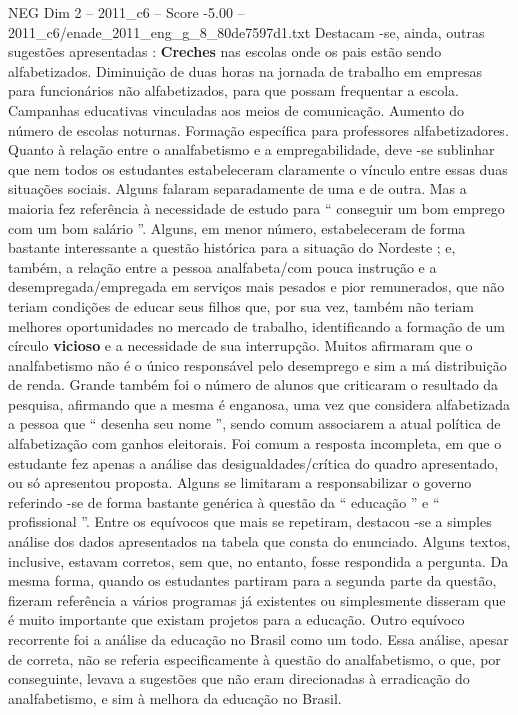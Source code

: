 \begin{textsample}{NEG Dim 2 – 2011\_c6 – Score -5.00 – 2011\_c6/enade\_2011\_eng\_g\_8\_80de7597d1.txt}
Destacam -se, ainda, outras sugestões apresentadas : \textbf{Creches} nas escolas onde os pais estão sendo alfabetizados.
Diminuição de duas horas na jornada de trabalho em empresas para funcionários não alfabetizados, para que possam frequentar a escola.
Campanhas educativas vinculadas aos meios de comunicação.
Aumento do número de escolas noturnas.
Formação específica para professores alfabetizadores.
Quanto à relação entre o analfabetismo e a empregabilidade, deve -se sublinhar que nem todos os estudantes estabeleceram claramente o vínculo entre essas duas situações sociais.
Alguns falaram separadamente de uma e de outra.
Mas a maioria fez referência à necessidade de estudo para “ conseguir um bom emprego com um bom salário ”.
Alguns, em menor número, estabeleceram de forma bastante interessante a questão histórica para a situação do Nordeste ; e, também, a relação entre a pessoa analfabeta/com pouca instrução e a desempregada/empregada em serviços mais pesados e pior remunerados, que não teriam condições de educar seus filhos que, por sua vez, também não teriam melhores oportunidades no mercado de trabalho, identificando a formação de um círculo \textbf{vicioso} e a necessidade de sua interrupção.
Muitos afirmaram que o analfabetismo não é o único responsável pelo desemprego e sim a má distribuição de renda.
Grande também foi o número de alunos que criticaram o resultado da pesquisa, afirmando que a mesma é enganosa, uma vez que considera alfabetizada a pessoa que “ desenha seu nome ”, sendo comum associarem a atual política de alfabetização com ganhos eleitorais.
Foi comum a resposta incompleta, em que o estudante fez apenas a análise das desigualdades/crítica do quadro apresentado, ou só apresentou proposta.
Alguns se limitaram a responsabilizar o governo referindo -se de forma bastante genérica à questão da “ educação ” e “ profissional ”.
Entre os equívocos que mais se repetiram, destacou -se a simples análise dos dados apresentados na tabela que consta do enunciado.
Alguns textos, inclusive, estavam corretos, sem que, no entanto, fosse respondida a pergunta.
Da mesma forma, quando os estudantes partiram para a segunda parte da questão, fizeram referência a vários programas já existentes ou simplesmente disseram que é muito importante que existam projetos para a educação.
Outro equívoco recorrente foi a análise da educação no Brasil como um todo.
Essa análise, apesar de correta, não se referia especificamente à questão do analfabetismo, o que, por conseguinte, levava a sugestões que não eram direcionadas à erradicação do analfabetismo, e sim à melhora da educação no Brasil.

\end{textsample}
